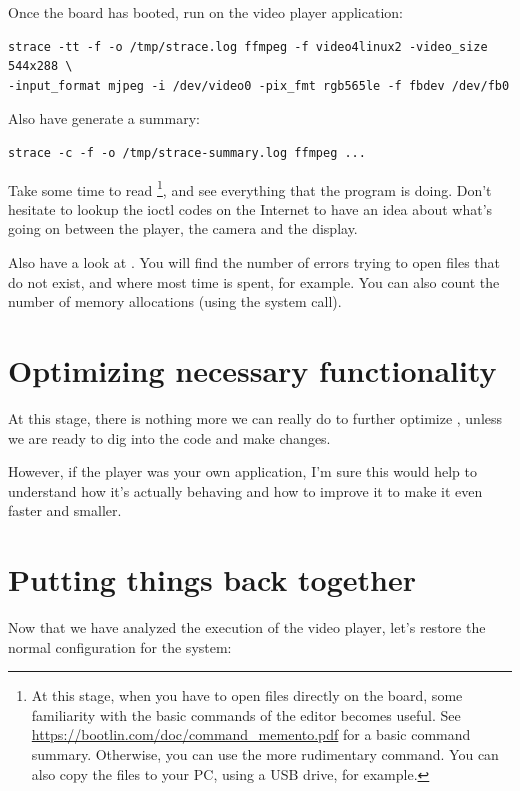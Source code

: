 Once the board has booted, run  on the video player
application:

\begin{verbatim}
strace -tt -f -o /tmp/strace.log ffmpeg -f video4linux2 -video_size 544x288 \
-input_format mjpeg -i /dev/video0 -pix_fmt rgb565le -f fbdev /dev/fb0
\end{verbatim}

Also have  generate a summary:

\begin{verbatim}
strace -c -f -o /tmp/strace-summary.log ffmpeg ...
\end{verbatim}

Take some time to read \footnote{
At this stage, when you have to open files directly on the
board, some familiarity with the basic commands of the  editor
becomes useful. See
\url{https://bootlin.com/doc/command_memento.pdf} for a basic
command summary. Otherwise, you can use the more rudimentary 
command. You can also copy the files to your PC, using a USB drive, for
example.}, and see everything that the program is doing. Don't hesitate
to lookup the ioctl codes on the Internet to have an idea about what's
going on between the player, the camera and the display.

Also have a look at . You will find the number
of errors trying to open files that do not exist, and where most time is
spent, for example. You can also count the number of memory allocations
(using the \code{mmap2} system call).

\section{Optimizing necessary functionality}

At this stage, there is nothing more we can really do to further
optimize \code{ffmpeg}, unless we are ready to dig into the code and
make changes.

However, if the player was your own application, I'm sure this would
help to understand how it's actually behaving and how to improve it to
make it even faster and smaller.

\section{Putting things back together}

Now that we have analyzed the execution of the video player, let's
restore the normal configuration for the system:

